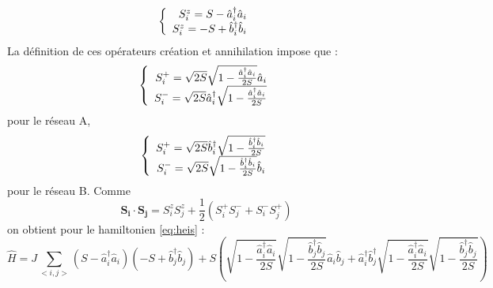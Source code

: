 \documentclass[a4paper, french]{report}
\newcommand{\an}{\hat{a}}
\newcommand{\cre}{\hat{a}^\dagger}
\newcommand{\h}{\ensuremath{\hat{H}}\xspace}
\newcommand{\ban}{\hat{b}}
\newcommand{\bcre}{\hat{b}^\dagger}
\newcommand{\1}{\ensuremath{\ket{\om_1\bom_1}}\xspace}
\newcommand{\2}{\ensuremath{\ket{\om_2\bom_2}}\xspace}
\begin{document}
\begin{equation}
\label{eq:sz}
\left\{
	\begin{array}{r c l}
		S_i^z=S-\cre_i\an_i\\
		S_i^z=-S+\bcre_i\ban_i
	\end{array}
\right.
\end{equation}
La définition de ces opérateurs création et annihilation impose que :
\begin{equation}
\left\{
	\begin{array}{r c l}
		S_i^+=\sqrt{2S}\sqrt{1-\frac{\cre_i\an_i}{2S}}\an_i\\
		S_i^-=\sqrt{2S}\cre_i\sqrt{1-\frac{\cre_i\an_i}{2S}}\\
	\end{array}
\right.
\end{equation}
pour le réseau A,
\begin{equation}
\left\{
	\begin{array}{r c l}
		S_i^+=\sqrt{2S}\bcre_i\sqrt{1-\frac{\bcre_i\ban_i}{2S}}\\
		S_i^-=\sqrt{2S}\sqrt{1-\frac{\bcre_i\ban_i}{2S}}\ban_i\\
	\end{array}
\right.
\end{equation}
pour le réseau B. Comme 
\[
	\mathbf{S_i}\cdot\mathbf{S_j}=S_i^zS_j^z+\frac{1}{2}(S_i^+S_j^-+S_i^-S_j^+)
\]
on obtient pour le hamiltonien \ref{eq:heis} :
\begin{equation}
\label{eq:ondspin}
	\h=J\sum_{<i,j>}(S-\cre_i\an_i)(-S+\bcre_j\ban_j)+S\left(\sqrt{1-\frac{\cre_i\an_i}{2S}}\sqrt{1-\frac{\bcre_j\ban_j}{2S}}\an_i\ban_j+\cre_i\bcre_j\sqrt{1-\frac{\cre_i\an_i}{2S}}\sqrt{1-\frac{\bcre_j\ban_j}{2S}}\right)
\end{equation}
\end{document}
